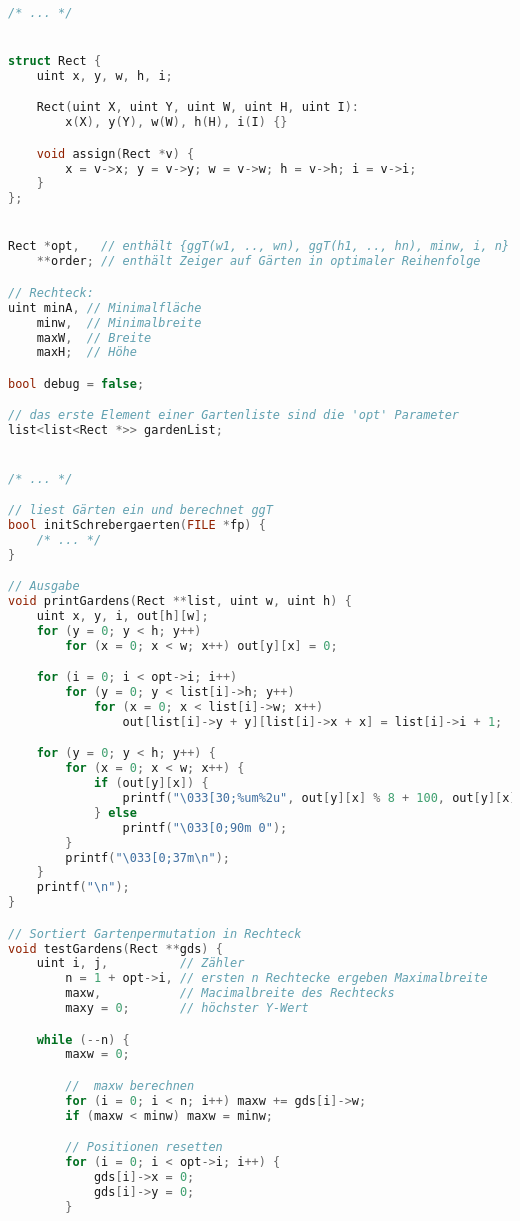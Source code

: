 \documentclass[a4paper,10pt,ngerman]{scrartcl}
\begin{document}
\begin{lstlisting}[language=C++]

/* ... */


struct Rect {
    uint x, y, w, h, i;

    Rect(uint X, uint Y, uint W, uint H, uint I):
        x(X), y(Y), w(W), h(H), i(I) {}

    void assign(Rect *v) {
        x = v->x; y = v->y; w = v->w; h = v->h; i = v->i;
    }
};


Rect *opt,   // enthält {ggT(w1, .., wn), ggT(h1, .., hn), minw, i, n} einer Gartenliste
    **order; // enthält Zeiger auf Gärten in optimaler Reihenfolge

// Rechteck:
uint minA, // Minimalfläche
    minw,  // Minimalbreite
    maxW,  // Breite
    maxH;  // Höhe

bool debug = false;

// das erste Element einer Gartenliste sind die 'opt' Parameter
list<list<Rect *>> gardenList;


/* ... */

// liest Gärten ein und berechnet ggT
bool initSchrebergaerten(FILE *fp) {
    /* ... */
}

// Ausgabe
void printGardens(Rect **list, uint w, uint h) {
    uint x, y, i, out[h][w];
    for (y = 0; y < h; y++)
        for (x = 0; x < w; x++) out[y][x] = 0;

    for (i = 0; i < opt->i; i++)
        for (y = 0; y < list[i]->h; y++)
            for (x = 0; x < list[i]->w; x++)
                out[list[i]->y + y][list[i]->x + x] = list[i]->i + 1;

    for (y = 0; y < h; y++) {
        for (x = 0; x < w; x++) {
            if (out[y][x]) {
                printf("\033[30;%um%2u", out[y][x] % 8 + 100, out[y][x]);
            } else
                printf("\033[0;90m 0");
        }
        printf("\033[0;37m\n");
    }
    printf("\n");
}

// Sortiert Gartenpermutation in Rechteck
void testGardens(Rect **gds) {
    uint i, j,          // Zähler
        n = 1 + opt->i, // ersten n Rechtecke ergeben Maximalbreite
        maxw,           // Macimalbreite des Rechtecks
        maxy = 0;       // höchster Y-Wert

    while (--n) {
        maxw = 0;

        //  maxw berechnen
        for (i = 0; i < n; i++) maxw += gds[i]->w;
        if (maxw < minw) maxw = minw;

        // Positionen resetten
        for (i = 0; i < opt->i; i++) {
            gds[i]->x = 0;
            gds[i]->y = 0;
        }


\end{lstlisting}
\end{document}
